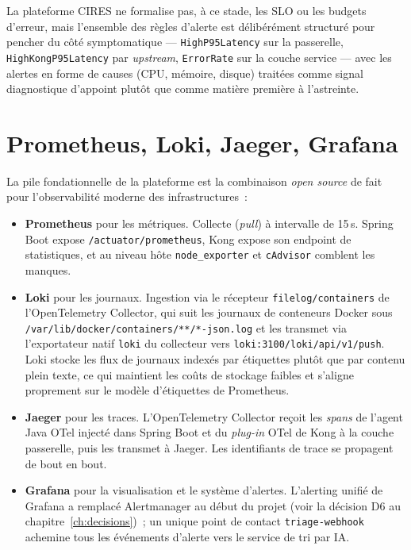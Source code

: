 \documentclass[11pt,a4paper,oneside]{report}
\begin{document}
La plateforme CIRES ne formalise pas, à ce stade, les SLO ou les
budgets d'erreur, mais l'ensemble des règles d'alerte est
délibérément structuré pour pencher du côté symptomatique ---
\texttt{HighP95Latency} sur la passerelle,
\texttt{HighKongP95Latency} par \emph{upstream},
\texttt{ErrorRate} sur la couche service --- avec les alertes en
forme de causes (CPU, mémoire, disque) traitées comme signal
diagnostique d'appoint plutôt que comme matière première à
l'astreinte.

\section{Prometheus, Loki, Jaeger, Grafana}

La pile fondationnelle de la plateforme est la combinaison
\emph{open source} de fait pour l'observabilité moderne des
infrastructures~:

\begin{itemize}
  \item \textbf{Prometheus} pour les métriques. Collecte (\emph{pull})
        à intervalle de 15\,s. Spring Boot expose
        \texttt{/actuator/prometheus}, Kong expose son endpoint de
        statistiques, et au niveau hôte \texttt{node\_exporter} et
        \texttt{cAdvisor} comblent les manques.
  \item \textbf{Loki} pour les journaux. Ingestion via le récepteur
        \texttt{filelog/containers} de l'OpenTelemetry Collector, qui
        suit les journaux de conteneurs Docker sous
        \texttt{/var/lib/docker/containers/**/*-json.log} et les
        transmet via l'exportateur natif \texttt{loki} du collecteur
        vers \texttt{loki:3100/loki/api/v1/push}. Loki stocke les
        flux de journaux indexés par étiquettes plutôt que par
        contenu plein texte, ce qui maintient les coûts de stockage
        faibles et s'aligne proprement sur le modèle d'étiquettes de
        Prometheus.
  \item \textbf{Jaeger} pour les traces. L'OpenTelemetry Collector
        reçoit les \emph{spans} de l'agent Java OTel injecté dans
        Spring Boot et du \emph{plug-in} OTel de Kong à la couche
        passerelle, puis les transmet à Jaeger. Les identifiants de
        trace se propagent de bout en bout.
  \item \textbf{Grafana} pour la visualisation et le système
        d'alertes. L'alerting unifié de Grafana a remplacé
        Alertmanager au début du projet (voir la décision D6 au
        chapitre~\ref{ch:decisions})~; un unique point de contact
        \texttt{triage-webhook} achemine tous les événements
        d'alerte vers le service de tri par IA.
\end{itemize}
\end{document}
